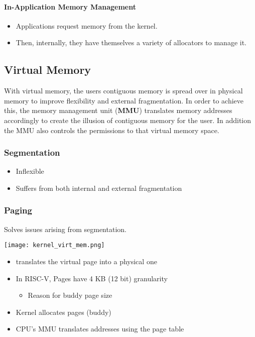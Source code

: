 \paragraph{In-Application Memory Management}

\begin{itemize}
    \item Applications request memory from the kernel.
    \item Then, internally, they have themselves a variety of allocators to manage it.
\end{itemize} 

\subsection{Virtual Memory}
With virtual memory, the users contiguous memory is spread over in physical memory to improve flexibility and external fragmentation.
In order to achieve this, the memory management unit (\textbf{MMU}) translates memory addresses accordingly to create the illusion of contiguous memory for the user. In addition the MMU also controls the permissions to that virtual memory space.
\subsubsection{Segmentation}

\begin{itemize}
    \item Inflexible
    \item Suffers from both internal and external fragmentation
\end{itemize}

\subsubsection{Paging}
Solves issues arising from segmentation.

\begin{center}
    \texttt{[image: kernel\_virt\_mem.png]}
\end{center}

\begin{itemize}
    \item translates the virtual page into a physical one
    \item In RISC-V, Pages have 4 KB (12 bit) granularity
    \begin{itemize}
        \item Reason for buddy page size
    \end{itemize}
    \item Kernel allocates pages (buddy)
    \item CPU's MMU translates addresses using the page table
\end{itemize}

